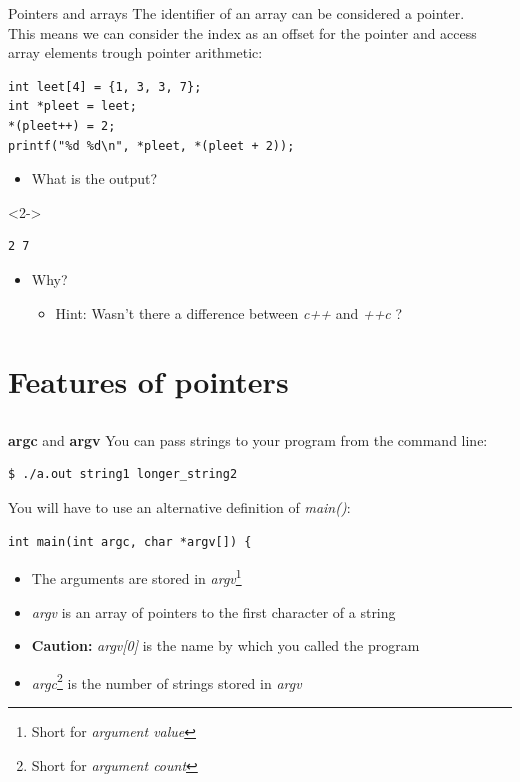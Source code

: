 \begin{frame}[fragile]{Pointers and arrays}
	The identifier of an array can be considered a pointer.\\
	This means we can consider the index as an offset for the pointer and access array elements trough pointer arithmetic:
	\begin{lstlisting}[numbers=none]
int leet[4] = {1, 3, 3, 7};
int *pleet = leet;
*(pleet++) = 2;
printf("%d %d\n", *pleet, *(pleet + 2));
\end{lstlisting}
	\begin{itemize}
		\item What is the output?
	\end{itemize}
	\begin{uncoverenv}<2->
		\begin{lstlisting}[numbers=none]
2 7
\end{lstlisting}
		\begin{itemize}
			\item Why?
			\begin{itemize}
				\item<3-> Hint: Wasn't there a difference between \textit{c++} and \textit{++c} ?
			\end{itemize}
		\end{itemize}
	\end{uncoverenv}
\end{frame}

\section{Features of pointers}
\subsection{}
\begin{frame}[fragile]{\textbf{argc} and \textbf{argv}}
	You can pass strings to your program from the command line:
	\begin{lstlisting}[numbers=none]
$ ./a.out string1 longer_string2
\end{lstlisting}
	\bigskip
	You will have to use an alternative definition of \textit{main()}:
	\begin{lstlisting}[numbers=none]
int main(int argc, char *argv[]) {
\end{lstlisting}
	\begin{itemize}
		\item The arguments are stored in \textit{argv}\footnote{Short for \textit{argument value}}
		\item \textit{argv} is an array of pointers to the first character of a string
		\item \textbf{Caution:} \textit{argv[0]} is the name by which you called the program
		\item \textit{argc}\footnote{Short for \textit{argument count}} is the number of strings stored in \textit{argv}
	\end{itemize}
\end{frame}

